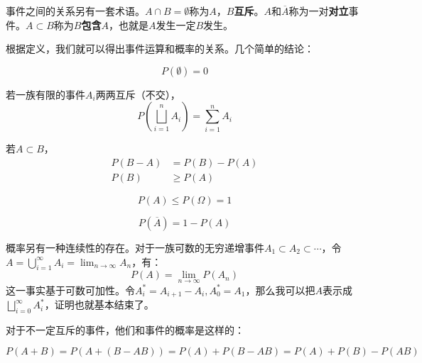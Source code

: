 事件之间的关系另有一套术语。$A\cap B=\emptyset$称为$A$，$B$\textbf{互斥}。$A$和$\overline{A}$称为一对\textbf{对立}事件。$A\subset B$称为$B$\textbf{包含}$A$，也就是$A$发生一定$B$发生。

根据定义，我们就可以得出事件运算和概率的关系。几个简单的结论：

\[
P(\emptyset) =0
\]

若一族有限的事件$A_i$两两互斥（不交），
\[
P(\bigsqcup_{i=1}^{n}A_i) = \sum_{i=1}^{n}A_i
\]

若$A\subset B$，
\begin{align*}
P(B-A)&=P(B)-P(A)\\
P(B)&\geq P(A)
\end{align*}

\[
P(A)\leq P(\Omega) = 1
\]

\[
P(\overline{A})=1-P(A)
\]

概率另有一种连续性的存在。对于一族可数的无穷递增事件$A_1\subset A_2 \subset \cdots $，令$A=\bigcup_{i=1}^{\infty}A_i=\lim_{n\to\infty}A_n$，有：
\[
P(A)=\lim_{n\to\infty}P(A_n)
\]
这一事实基于可数可加性。令$A^*_i=A_{i+1}-A_i,A_0^*=A_1$，那么我可以把$A$表示成$\bigsqcup_{i=0}^{\infty}A^*_i$，证明也就基本结束了。

对于不一定互斥的事件，他们和事件的概率是这样的：

\[
P(A+B) = P(A+(B-AB)) = P(A) + P(B-AB) =P(A)+P(B)-P(AB)
\]

